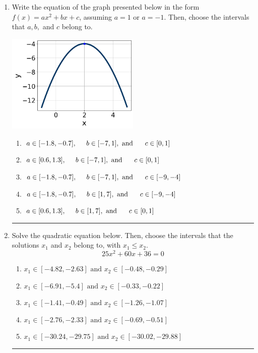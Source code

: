 \documentclass[14pt]{extbook}
\newcommand{\litem}[1]{\item#1\hspace*{-1cm}\rule{\textwidth}{0.4pt}}
\begin{document}
\begin{enumerate}
{\begin{enumerate}[label=\Alph*.]
\end{enumerate} }
\litem{
Write the equation of the graph presented below in the form $f(x)=ax^2+bx+c$, assuming  $a=1$ or $a=-1$. Then, choose the intervals that $a, b,$ and $c$ belong to.
\begin{center}
    \includegraphics[width=0.5\textwidth]{../Figures/quadraticGraphToEquationB.png}
\end{center}
\begin{enumerate}[label=\Alph*.]
\item \( a \in [-1.8, -0.7], \hspace*{5mm} b \in [-7, 1], \text{ and } \hspace*{5mm} c \in [0, 1] \)
\item \( a \in [0.6, 1.3], \hspace*{5mm} b \in [-7, 1], \text{ and } \hspace*{5mm} c \in [0, 1] \)
\item \( a \in [-1.8, -0.7], \hspace*{5mm} b \in [-7, 1], \text{ and } \hspace*{5mm} c \in [-9, -4] \)
\item \( a \in [-1.8, -0.7], \hspace*{5mm} b \in [1, 7], \text{ and } \hspace*{5mm} c \in [-9, -4] \)
\item \( a \in [0.6, 1.3], \hspace*{5mm} b \in [1, 7], \text{ and } \hspace*{5mm} c \in [0, 1] \)

\end{enumerate} }
\litem{
Solve the quadratic equation below. Then, choose the intervals that the solutions $x_1$ and $x_2$ belong to, with $x_1 \leq x_2$.\[ 25x^{2} +60 x + 36 = 0 \]\begin{enumerate}[label=\Alph*.]
\item \( x_1 \in [-4.82, -2.63] \text{ and } x_2 \in [-0.48, -0.29] \)
\item \( x_1 \in [-6.91, -5.4] \text{ and } x_2 \in [-0.33, -0.22] \)
\item \( x_1 \in [-1.41, -0.49] \text{ and } x_2 \in [-1.26, -1.07] \)
\item \( x_1 \in [-2.76, -2.33] \text{ and } x_2 \in [-0.69, -0.51] \)
\item \( x_1 \in [-30.24, -29.75] \text{ and } x_2 \in [-30.02, -29.88] \)


\end{enumerate}}
\end{enumerate}
\end{document}
